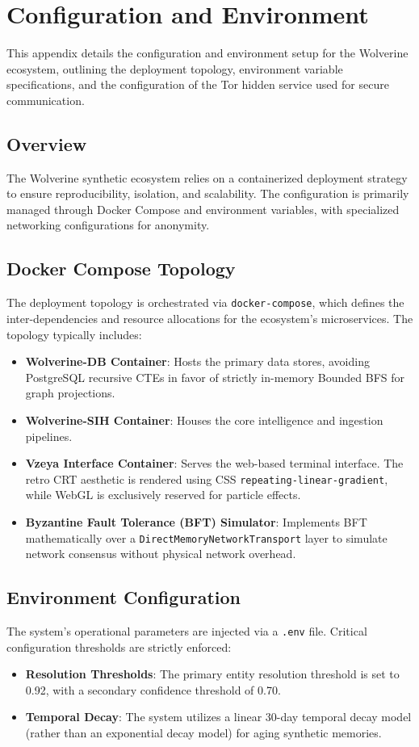\chapter{Configuration and Environment}
\label{app:configuration}

This appendix details the configuration and environment setup for the Wolverine ecosystem, outlining the deployment topology, environment variable specifications, and the configuration of the Tor hidden service used for secure communication.

\section{Overview}
The Wolverine synthetic ecosystem relies on a containerized deployment strategy to ensure reproducibility, isolation, and scalability. The configuration is primarily managed through Docker Compose and environment variables, with specialized networking configurations for anonymity.

\section{Docker Compose Topology}
The deployment topology is orchestrated via \texttt{docker-compose}, which defines the inter-dependencies and resource allocations for the ecosystem's microservices. The topology typically includes:
\begin{itemize}
    \item \textbf{Wolverine-DB Container}: Hosts the primary data stores, avoiding PostgreSQL recursive CTEs in favor of strictly in-memory Bounded BFS for graph projections.
    \item \textbf{Wolverine-SIH Container}: Houses the core intelligence and ingestion pipelines.
    \item \textbf{Vzeya Interface Container}: Serves the web-based terminal interface. The retro CRT aesthetic is rendered using CSS \texttt{repeating-linear-gradient}, while WebGL is exclusively reserved for particle effects.
    \item \textbf{Byzantine Fault Tolerance (BFT) Simulator}: Implements BFT mathematically over a \texttt{DirectMemoryNetworkTransport} layer to simulate network consensus without physical network overhead.
\end{itemize}

\section{Environment Configuration}
The system's operational parameters are injected via a \texttt{.env} file. Critical configuration thresholds are strictly enforced:
\begin{itemize}
    \item \textbf{Resolution Thresholds}: The primary entity resolution threshold is set to 0.92, with a secondary confidence threshold of 0.70.
    \item \textbf{Temporal Decay}: The system utilizes a linear 30-day temporal decay model (rather than an exponential decay model) for aging synthetic memories.
\end{itemize}

